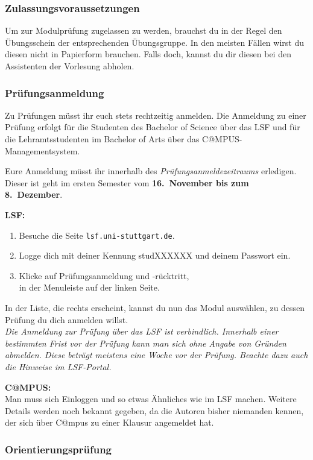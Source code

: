 \subsubsection{Zulassungsvoraussetzungen}\label{sssec:zu}

Um zur Modulprüfung zugelassen zu werden,
brauchst du in der Regel den Übungsschein
der entsprechenden Übungsgruppe.
In den meisten Fällen wirst du diesen nicht in Papierform brauchen.
Falls doch, kannst du dir diesen bei den Assistenten der Vorlesung abholen.


\subsubsection{Prüfungsanmeldung}\label{sssec:pa}

Zu Prüfungen müsst ihr euch stets rechtzeitig anmelden.
Die Anmeldung zu einer Prüfung erfolgt
für die Studenten des Bachelor of Science
über das LSF
und für die Lehramtsstudenten im Bachelor of Arts
über das C@MPUS-Managementsystem.

Eure Anmeldung müsst ihr innerhalb
des {\it Prüfungsanmeldezeitraums} erledigen.
Dieser ist geht im ersten Semester
vom {\bf 16.~November bis zum 8.~Dezember}.

{\bf LSF:}
\begin{enumerate}
\item
Besuche die Seite {\small\verb|lsf.uni-stuttgart.de|}.
\item
Logge dich mit deiner Kennung studXXXXXX und deinem Passwort ein.
\item
Klicke auf \glqq Prüfungsanmeldung und -rücktritt\grqq,\\
in der Menuleiste auf der linken Seite.
\end{enumerate}
In der Liste, die rechts erscheint,
kannst du nun das Modul auswählen,
zu dessen Prüfung du dich anmelden willst.\\
{\it Die Anmeldung zur Prüfung über das LSF ist verbindlich.
Innerhalb einer bestimmten Frist vor der Prüfung
kann man sich ohne Angabe von Gründen abmelden.
Diese beträgt meistens eine Woche vor der Prüfung.
Beachte dazu auch die Hinweise im LSF-Portal.}

{\bf C@MPUS:}\\
Man muss sich Einloggen und
so etwas Ähnliches wie im LSF machen.
Weitere Details werden noch bekannt gegeben,
da die Autoren bisher niemanden kennen, der sich über C@mpus
zu einer Klausur angemeldet hat.

\subsubsection{Orientierungsprüfung}\label{sssec:or}

